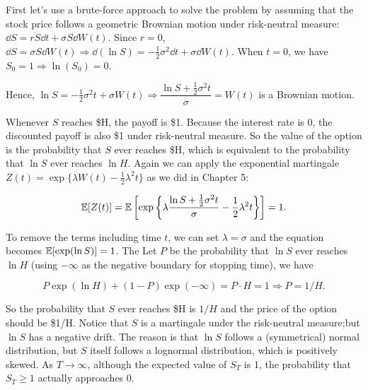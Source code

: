 \begin{solution}
First let's use a brute-force approach to solve the problem by assuming that the stock
price follows a geometric Brownian motion under risk-neutral measure:
$\dd S=rS\dd t+\sigma S\dd W(t)$. Since $r=0$,
$\dd S=\sigma S\dd W(t)\Rightarrow \dd(\ln S)=-\frac{1}{2}\sigma^2\dd t+\sigma\dd W(t)$.
When $t=0$, we have $S_0=1\Rightarrow\ln(S_0)=0$.



Hence, $\ln S=-\frac{1}{2}\sigma^2t+\sigma W(t)\Rightarrow
\dfrac{\ln S+\frac{1}{2}\sigma^2t}{\sigma}=W(t)$ is a Brownian motion.

Whenever $S$ reaches \$H, the payoff is \$1. Because the interest rate is 0, the
discounted payoff is also \$1 under risk-neutral measure. So the value of the option is the
probability that $S$ ever reaches \$H, which is equivalent to the probability that $\ln S$
ever reaches $\ln H$. Again we can apply the exponential martingale
$Z(t)=\exp\{\lambda W(t)-\frac{1}{2}\lambda^2t\}$ as we did in Chapter 5:

\[
\mathbb{E}[Z(t)]=\mathbb{E}\left[\exp\left\{\lambda
\frac{\ln S+\frac{1}{2}\sigma^2t}{\sigma}-\frac{1}{2}\lambda^2t\right\}\right]=1.
\]

To remove the terms including time $t$, we can set $\lambda=\sigma$ and the equation
becomes $\mathbb{E}[\exp(\ln S)]=1$. The Let $P$ be the probability that $\ln S$ ever
reaches $\ln H$ (using $-\infty$ as the negative boundary for stopping time), we have

\[
P\exp(\ln H)+(1-P)\exp(-\infty)=P\cdot H=1\Rightarrow P=1/H.
\]

So the probability that $S$ ever reaches \$H is $1/H$ and the price of the option
should be \$1/H. Notice that $S$ is a martingale under the risk-neutral measure;\footnotemark[8]
but $\ln S$ has a negative drift. The reason is that $\ln S$ follows a (symmetrical)
normal distribution, but $S$ itself follows a lognormal distribution, which is positively
skewed. As $T\to\infty$, although the expected value of $S_T$ is 1, the probability that
$S_T\geq1$ actually approaches 0.


\end{solution}
